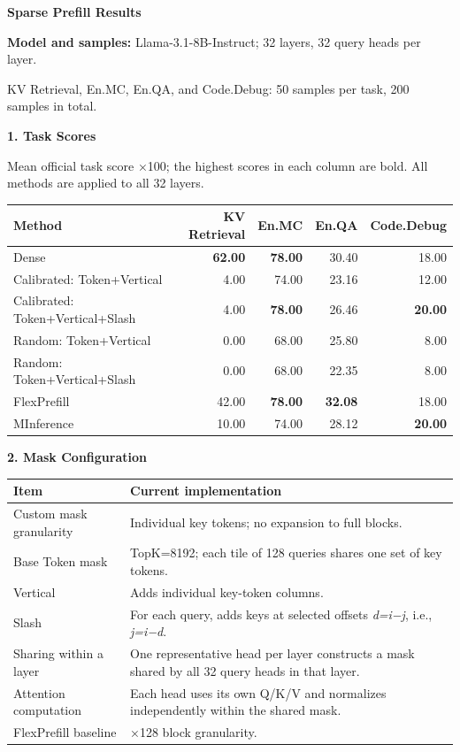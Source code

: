 \documentclass[11pt,a4paper]{article}
\begin{document}
\begin{center}
  {\Large\bfseries Sparse Prefill Results}
\end{center}

\textbf{Model and samples:} Llama-3.1-8B-Instruct; 32 layers, 32 query heads per layer.\par
KV Retrieval, En.MC, En.QA, and Code.Debug: 50 samples per task, 200 samples in total.

\vspace{5pt}
{\large\bfseries 1. Task Scores}

Mean official task score ×100; the highest scores in each column are bold.
All methods are applied to all 32 layers.

\begingroup
\setlength{\tabcolsep}{5pt}
\begin{tabularx}{\textwidth}{@{}Xrrrr@{}}
\toprule
\textbf{Method} & \textbf{KV Retrieval} & \textbf{En.MC} & \textbf{En.QA} & \textbf{Code.Debug} \\
\midrule
Dense & \textbf{62.00} & \textbf{78.00} & 30.40 & 18.00 \\
Calibrated: Token+Vertical & 4.00 & 74.00 & 23.16 & 12.00 \\
Calibrated: Token+Vertical+Slash & 4.00 & \textbf{78.00} & 26.46 & \textbf{20.00} \\
Random: Token+Vertical & 0.00 & 68.00 & 25.80 & 8.00 \\
Random: Token+Vertical+Slash & 0.00 & 68.00 & 22.35 & 8.00 \\
FlexPrefill & 42.00 & \textbf{78.00} & \textbf{32.08} & 18.00 \\
MInference & 10.00 & 74.00 & 28.12 & \textbf{20.00} \\
\bottomrule
\end{tabularx}
\endgroup

\vspace{3pt}
{\large\bfseries 2. Mask Configuration}

\begin{tabularx}{\textwidth}{@{}>{\raggedright\arraybackslash}p{38mm}>{\raggedright\arraybackslash}X@{}}
\toprule
\textbf{Item} & \textbf{Current implementation} \\
\midrule
Custom mask granularity & Individual key tokens; no expansion to full blocks. \\
Base Token mask & TopK=8192; each tile of 128 queries shares one set of key tokens. \\
Vertical & Adds individual key-token columns. \\
Slash & For each query, adds keys at selected offsets \textit{d=i−j}, i.e., \textit{j=i−d}. \\
Sharing within a layer & One representative head per layer constructs a mask shared by all 32 query heads in that layer. \\
Attention computation & Each head uses its own Q/K/V and normalizes independently within the shared mask. \\
FlexPrefill baseline & 128×128 block granularity. \\
\bottomrule
\end{tabularx}
\end{document}

